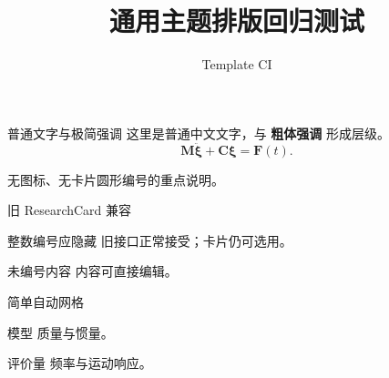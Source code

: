 \documentclass[UTF8,aspectratio=169]{beamer}
\title{通用主题排版回归测试}
\author{Template CI}
\date{}
\begin{document}
\begin{frame}[t]{普通文字与极简强调}
  这里是普通中文文字，与 \textbf{粗体强调} 形成层级。
  \[
    \mathbf{M}\ddot{\boldsymbol{\xi}}+
    \mathbf{C}\boldsymbol{\xi}=\mathbf{F}(t).
  \]
  \begin{ResearchNote}
    无图标、无卡片圆形编号的重点说明。
  \end{ResearchNote}
\end{frame}
\begin{frame}[t]{旧 ResearchCard 兼容}
  \begin{ResearchCard}[1]{整数编号应隐藏}
    旧接口正常接受；卡片仍可选用。
  \end{ResearchCard}
  \begin{ResearchCard}{未编号内容}
    内容可直接编辑。
  \end{ResearchCard}
\end{frame}
\begin{frame}[t]{简单自动网格}
  \begin{autolayout}[mode=balanced,layout=2]
    \begin{autoblock}{模型}
      质量与惯量。
    \end{autoblock}
    \begin{autoblock}{评价量}
      频率与运动响应。
    \end{autoblock}
  \end{autolayout}
\end{frame}
\end{document}
